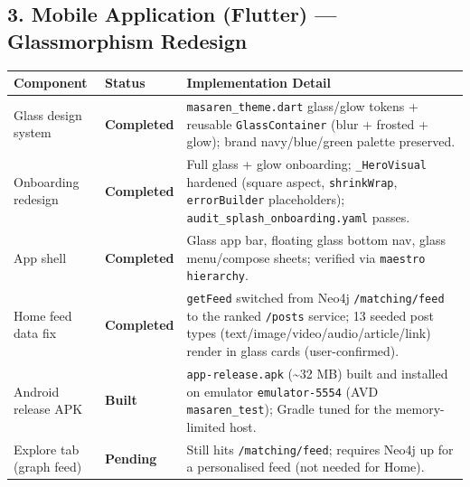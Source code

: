 \documentclass[11pt,a4paper]{article}
\newcommand{\status}[1]{\textcolor{masarengreen}{\bfseries #1}}
\newcommand{\gap}[1]{\textcolor{masarenred}{\bfseries #1}}
\newcommand{\code}[1]{\texttt{#1}}
\begin{document}
\subsection*{3. Mobile Application (Flutter) --- Glassmorphism Redesign}
\begin{tabularx}{\textwidth}{L{4.6cm}L{2.4cm}Y}
\toprule
\textbf{Component} & \textbf{Status} & \textbf{Implementation Detail} \\
\midrule
Glass design system & \status{Completed} & \code{masaren\_theme.dart} glass/glow tokens + reusable \code{GlassContainer} (blur + frosted + glow); brand navy/blue/green palette preserved. \\
\hline
Onboarding redesign & \status{Completed} & Full glass + glow onboarding; \code{\_HeroVisual} hardened (square aspect, \code{shrinkWrap}, \code{errorBuilder} placeholders); \code{audit\_splash\_onboarding.yaml} passes. \\
\hline
App shell & \status{Completed} & Glass app bar, floating glass bottom nav, glass menu/compose sheets; verified via \code{maestro hierarchy}. \\
\hline
Home feed data fix & \status{Completed} & \code{getFeed} switched from Neo4j \code{/matching/feed} to the ranked \code{/posts} service; 13 seeded post types (text/image/video/audio/article/link) render in glass cards (user-confirmed). \\
\hline
Android release APK & \status{Built} & \code{app-release.apk} (\textasciitilde{}32 MB) built and installed on emulator \code{emulator-5554} (AVD \code{masaren\_test}); Gradle tuned for the memory-limited host. \\
\hline
Explore tab (graph feed) & \gap{Pending} & Still hits \code{/matching/feed}; requires Neo4j up for a personalised feed (not needed for Home). \\
\bottomrule
\end{tabularx}

\vspace{0.6em}
\end{document}
